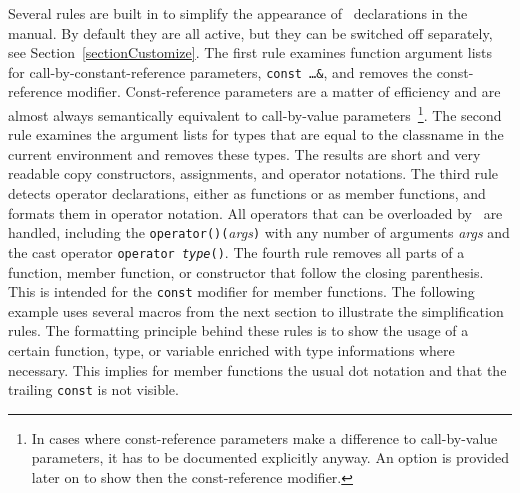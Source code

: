 \documentclass[11pt]{article}
\begin{document}
  
   
 
  
Several rules are built in to simplify the appearance of \CC\
declarations in the manual. By default they are all active, but they
can be switched off separately, see Section~\ref{sectionCustomize}.
The first rule examines function argument lists for
call-by-constant-reference parameters, {\tt const \ldots \&}, and
removes the const-reference modifier. Const-reference parameters are a
matter of efficiency and are almost always semantically equivalent to
call-by-value parameters~\footnote{In cases where const-reference
  parameters make a difference to call-by-value parameters, it has to
  be documented explicitly anyway. An option is provided later on to
  show then the const-reference modifier.}. The second rule examines
the argument lists for types that are equal to the classname in the
current environment and removes these types. The results are short and
very readable copy constructors, assignments, and operator notations.
The third rule detects operator declarations, either as functions or
as member functions, and formats them in operator notation. All
operators that can be overloaded by \CC\ are handled, including the
{\tt operator()(}{\em args\/}{\tt )} with any number of arguments {\em
  args} and the cast operator {\tt operator {\em type\/}()}.  The
fourth rule removes all parts of a function, member function, or
constructor that follow the closing parenthesis. This is intended for
the {\tt const} modifier for member functions. The following example
uses several macros from the next section to illustrate the
simplification rules. The formatting principle behind these rules is
to show the usage of a certain function, type, or variable enriched
with type informations where necessary. This implies for member
functions the usual dot notation and that the trailing {\tt const} is
not visible.
\end{document}
